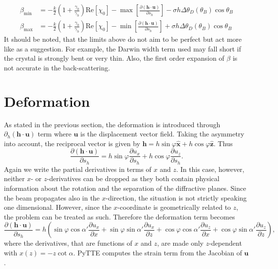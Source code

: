 \documentclass[11pt,a4paper]{article}
\begin{document}
\begin{align}
\beta_{\mathrm{min}} &= - \frac{k}{2} \left( 1 + \frac{\gamma_0}{\gamma_h} \right) \mathrm{Re}[\chi_0] - \max \left[ \frac{\partial (\mathbf{h}\cdot\mathbf{u}) }{\partial s_h} \right] - \sigma h \Delta \theta_D (\theta_B) \cos \theta_B \\
\beta_{\mathrm{max}} &= -\frac{k}{2} \left( 1 + \frac{\gamma_0}{\gamma_h} \right) \mathrm{Re}[\chi_0] - \min \left[  \frac{\partial (\mathbf{h}\cdot\mathbf{u}) }{\partial s_h} \right] +  \sigma h \Delta \theta_D (\theta_B) \cos \theta_B
\end{align}
It should be noted, that the limits above do not aim to be perfect but act more like as a suggestion. For example, the Darwin width term used may fall short if the crystal is strongly bent or very thin. Also, the first order expansion of $\beta$ is not accurate in the back-scattering.

\section{Deformation}
As stated in the previous section, the deformation is introduced through $\partial_h(\mathbf{h}\cdot \mathbf{u})$ term where $\mathbf{u}$ is the displacement vector field. Taking the asymmetry into account, the reciprocal vector is given by $\mathbf{h} = h \sin \varphi \hat{\mathbf{x}} + h \cos \varphi \hat{\mathbf{z}}$. Thus
\begin{equation}
\frac{\partial (\mathbf{h}\cdot \mathbf{u})}{\partial s_h} = h \sin \varphi \frac{\partial u_x}{\partial s_h} + h \cos \varphi \frac{\partial u_z}{\partial s_h}.
\end{equation}
Again we write the partial derivatives in terms of $x$ and $z$. In this case, however, neither $x$- or $z$-derivatives can be dropped as they both contain physical information about the rotation and the separation of the diffractive planes. Since the beam propagates also in the $x$-direction, the situation is not strictly speaking one dimensional. However, since the $x$-coordinate is geometrically related to $z$, the problem can be treated as such. Therefore the deformation term becomes
\begin{equation}
\frac{\partial (\mathbf{h}\cdot \mathbf{u})}{\partial s_h} = h \left( 
\sin \varphi \cos \alpha' \frac{\partial u_x}{\partial x} 
+\sin \varphi \sin \alpha' \frac{\partial u_x}{\partial z} 
+\cos \varphi \cos \alpha' \frac{\partial u_z}{\partial x} 
+\cos \varphi \sin \alpha' \frac{\partial u_z}{\partial z} 
 \right),
\end{equation}
where the derivatives, that are functions of $x$ and $z$, are made only $z$-dependent with $x(z)=-z \cot \alpha$. PyTTE computes the strain term from the Jacobian of $\mathbf{u}$.
\end{document}
